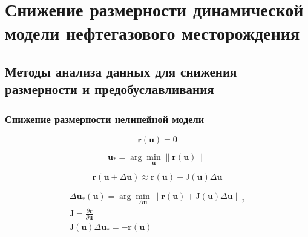 \chapter{Снижение размерности динамической модели нефтегазового месторождения}\label{ch:ch2}




\section{Методы анализа данных для снижения размерности и предобуславливания}

\subsection{Снижение размерности нелинейной модели}

\newcommand{\bvec}[1]{\mathbf{#1}}
\newcommand{\resid}{\bvec{r}}
\newcommand{\unk}{\bvec{u}}
\newcommand{\jac}{\mathrm{J}}
\newcommand{\dunk}{\Delta \unk}
\newcommand{\vunk}{\bvec{v}}
\newcommand{\matr}[1]{\mathrm{\uppercase{#1}}}
\newcommand{\norm}[2][~]{\left\| #2  \right\|_{#1}}
\newcommand{\transpose}[1]{\matr{#1}^\mathrm{T}}
\newcommand{\dvunk}{\Delta \vunk}
\newcommand{\deriv}[3][]{\frac{\partial^{#1} #2}{\partial #3^{#1}}}
\newcommand{\pc}[1][~]{\bvec{\varphi}_{#1}}
\newcommand{\param}{\bvec{\mu}}
\newcommand{\nlin}{\bvec{\eta}}

\begin{equation}
   \resid(\unk) = 0
\end{equation}

\begin{equation}
    \unk_\ast = \arg \min_{\unk} \norm{\resid(\unk)}
\end{equation}

\begin{equation}
    \resid(\unk + \Delta \unk) \approx \resid(\unk) + \jac(\unk) \dunk
\end{equation}

\begin{align}
    \dunk_\ast (\unk) = \arg \min_{\dunk} \norm[2]{\resid(\unk) + \jac(\unk) \dunk} \\
    \jac = \deriv{\resid}{\unk} \\
    \jac(\unk) \dunk_\ast = - \resid(\unk)
\end{align}

